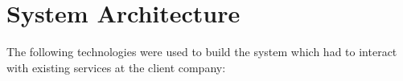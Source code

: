 %
%

\section{System Architecture}
\label{architecture}

 The following technologies were used to build the system which had to interact with existing services  at the client company:

